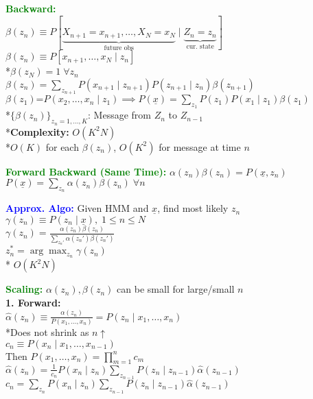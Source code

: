\documentclass[5pt]{extarticle} %
\begin{document}
\begin{paracol}{3}
{    \textcolor{green}{\textbf{Backward:}} \\
    $\beta(z_n) \equiv P[\underbrace{X_{n+1} = x_{n+1},\ldots,X_N=x_N}_{\text{future obs}} \mid \underbrace{Z_n = z_n}_{\text{cur. state}}]$ \\
    $\beta(z_n) \equiv P[x_{n+1},\ldots,x_N \mid z_n]$ \\
    *$\beta(z_N) = 1 \; \forall z_n$ \\
    $\boxed{\beta(z_n) = \sum_{z_{n+1}} P(x_{n+1} \mid z_{n+1}) P(z_{n+1} \mid z_n) \beta(z_{n+1})}$ \\
    $\boxed{\beta(z_1) \text{=} P(x_2,\ldots,x_n \mid z_1) \implies P(\underline{x}) = \sum_{z_1} P(z_1) P(x_1 \mid z_1) \beta(z_1)}$ \\
    *$\{\beta(z_n)\}_{z_n = 1,\ldots,K}$: Message from $Z_n$ to $Z_{n-1}$ \\
    *\textbf{Complexity:} $O(K^2 N)$ \\
    *$O(K)$ for each $\beta(z_n)$, $O(K^2)$ for message at time $n$

    \textcolor{green}{\textbf{Forward Backward (Same Time):}} $\alpha (z_n) \beta(z_n) = P(\underline{x}, z_n)$ \\
    $P(\underline{x}) = \sum_{z_n} \alpha(z_n) \beta(z_n) \; \forall n$ 

    \textcolor{blue}{\textbf{Approx. Algo:}} Given HMM and $\underline{x}$, find most likely $z_n$\\
    $\gamma (z_n) \equiv P(z_n \mid \underline{x}), \; 1 \leq n \leq N$ \\
    $\boxed{\gamma(z_n) = \frac{\alpha(z_n) \beta(z_n)}{\sum_{z_n'} \alpha(z_n') \beta(z_n')}}$ \\
    $\boxed{z_n^* = \arg \max_{z_n} \gamma(z_n)}$ \\
    * $O(K^2 N)$ 

    \textcolor{green}{\textbf{Scaling:}} $\alpha(z_n),\beta(z_n)$ can be small for large/small $n$ \\ 
    \textbf{1. Forward:} \\
    $\hat{\alpha}(z_n) \equiv \frac{\alpha(z_n)}{P(x_1,\ldots,x_n)} = P(z_n \mid x_1,\ldots,x_n)$ \\
    *Does not shrink as $n \uparrow$ \\
    $c_n \equiv P(x_n \mid x_1,\ldots,x_{n-1})$ \\
    Then $P(x_1,\ldots,x_n) = \prod_{m=1}^n c_m$ \\
    $\boxed{\hat{\alpha}(z_n) = \frac{1}{c_n} P(x_n \mid z_n) \sum_{z_{n-1}} P(z_n \mid z_{n-1}) \hat{\alpha}(z_{n-1})}$ \\
    $\boxed{c_n = \sum_{z_n} P(x_n \mid z_n) \sum_{z_{n-1}} P(z_n \mid z_{n-1}) \hat{\alpha}(z_{n-1})}$ 

}
\end{paracol}
\end{document}
